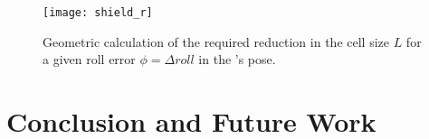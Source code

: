 \documentclass[a4paper]{report}
\begin{document}
\begin{figure}[bt]
\centering
\texttt{[image: shield\_r]}
\caption{Geometric calculation of the required reduction in the cell size $L$ for a given roll error $\phi = \Delta roll$ in the \calS's pose.}
\label{fig:shield_r}
\end{figure}

\newpage

\chapter{Conclusion and Future Work}

\newpage



\end{document}
